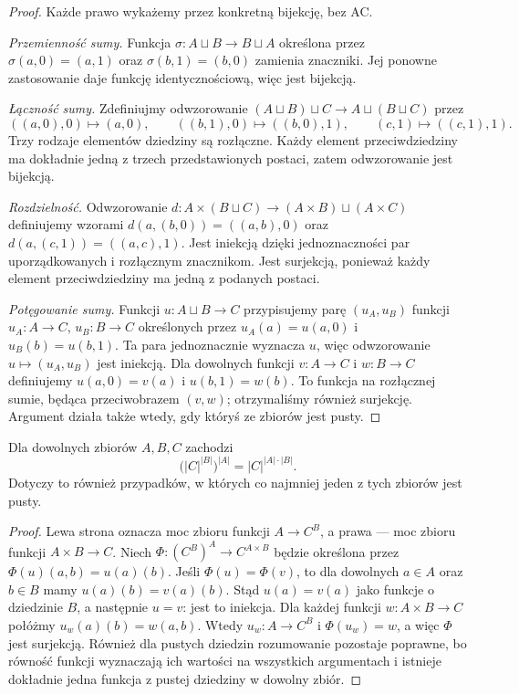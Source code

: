 \begin{proof}
Każde prawo wykażemy przez konkretną bijekcję, bez AC.

\emph{Przemienność sumy.}
Funkcja $\sigma:A\sqcup B\to B\sqcup A$
określona przez $\sigma(a,0)=(a,1)$
oraz $\sigma(b,1)=(b,0)$ zamienia znaczniki.
Jej ponowne zastosowanie daje funkcję identycznościową,
więc jest bijekcją.

\emph{Łączność sumy.}
Zdefiniujmy odwzorowanie
$(A\sqcup B)\sqcup C\to A\sqcup(B\sqcup C)$ przez
\[
((a,0),0)\longmapsto(a,0),\qquad
((b,1),0)\longmapsto((b,0),1),\qquad
(c,1)\longmapsto((c,1),1).
\]
Trzy rodzaje elementów dziedziny są rozłączne.
Każdy element przeciwdziedziny ma dokładnie jedną
z trzech przedstawionych postaci, zatem odwzorowanie
jest bijekcją.

\emph{Rozdzielność.}
Odwzorowanie $d:A\times(B\sqcup C)\to
(A\times B)\sqcup(A\times C)$
definiujemy wzorami
$d(a,(b,0))=((a,b),0)$ oraz
$d(a,(c,1))=((a,c),1)$.
Jest iniekcją dzięki jednoznaczności par uporządkowanych
i rozłącznym znacznikom. Jest surjekcją, ponieważ
każdy element przeciwdziedziny ma jedną z podanych postaci.

\emph{Potęgowanie sumy.}
Funkcji $u:A\sqcup B\to C$ przypisujemy parę
$(u_A,u_B)$ funkcji $u_A:A\to C$, $u_B:B\to C$
określonych przez $u_A(a)=u(a,0)$ i $u_B(b)=u(b,1)$.
Ta para jednoznacznie wyznacza $u$,
więc odwzorowanie $u\mapsto(u_A,u_B)$ jest iniekcją.
Dla dowolnych funkcji $v:A\to C$ i $w:B\to C$
definiujemy $u(a,0)=v(a)$ i $u(b,1)=w(b)$.
To funkcja na rozłącznej sumie, będąca przeciwobrazem
$(v,w)$; otrzymaliśmy również surjekcję.
Argument działa także wtedy, gdy któryś
ze zbiorów jest pusty.
\end{proof}

\begin{twierdzenie}\label{thm:card-exponent-exponent}
Dla dowolnych zbiorów $A,B,C$ zachodzi
\[
\bigl(|C|^{|B|}\bigr)^{|A|}
=|C|^{|A|\cdot|B|}.
\]
Dotyczy to również przypadków, w których
co najmniej jeden z tych zbiorów jest pusty.
\end{twierdzenie}
\begin{proof}
Lewa strona oznacza moc zbioru funkcji
$A\to C^B$, a prawa --- moc zbioru funkcji $A\times B\to C$.
Niech $\Phi:(C^B)^A\to C^{A\times B}$
będzie określona przez
$\Phi(u)(a,b)=u(a)(b)$.
Jeśli $\Phi(u)=\Phi(v)$, to dla dowolnych
$a\in A$ oraz $b\in B$ mamy $u(a)(b)=v(a)(b)$.
Stąd $u(a)=v(a)$ jako funkcje o dziedzinie $B$,
a następnie $u=v$: jest to iniekcja.
Dla każdej funkcji $w:A\times B\to C$ połóżmy
$u_w(a)(b)=w(a,b)$. Wtedy
$u_w:A\to C^B$ i $\Phi(u_w)=w$, a więc $\Phi$ jest surjekcją.
Również dla pustych dziedzin rozumowanie pozostaje poprawne,
bo równość funkcji wyznaczają ich wartości na wszystkich
argumentach i istnieje dokładnie jedna funkcja z pustej
dziedziny w dowolny zbiór.
\end{proof}

